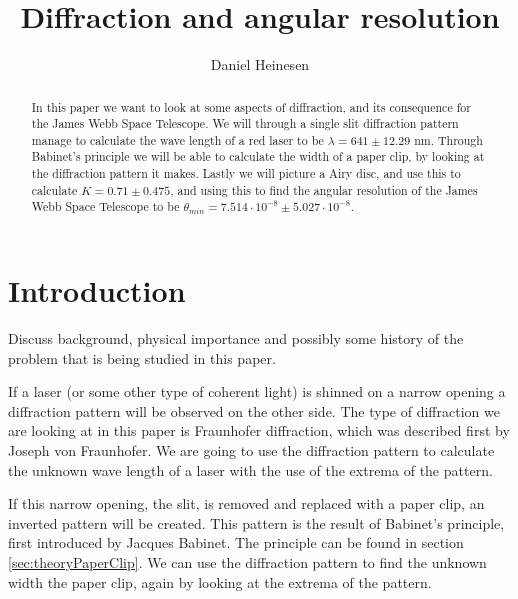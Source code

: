 \documentclass{emulateapj}
\begin{document}
\title{Diffraction and angular resolution}

\author{Daniel Heinesen}





\begin{abstract}
In this paper we want to look at some aspects of diffraction, and its consequence for the James Webb Space Telescope. We will through a single slit diffraction pattern manage to calculate the wave length of a red laser to be $\lambda = 641 \pm 12.29 \text{ nm}$. Through Babinet's principle we will be able to calculate the width of a paper clip, by looking at the diffraction pattern it makes. Lastly we will picture a Airy disc, and use this to calculate $K = 0.71 \pm 0.475$, and using this to find the angular resolution of the James Webb Space Telescope to be $\theta_{min} = 7.514\cdot 10^{-8} \pm 5.027\cdot 10^{-8}$.
\end{abstract}

\section{Introduction}
\label{sec:introduction}

Discuss background, physical importance and possibly some history of
the problem that is being studied in this paper.


If a laser (or some other type of coherent light) is shinned on a narrow opening a diffraction pattern will be observed on the other side. The type of diffraction we are looking at in this paper is Fraunhofer diffraction, which was described first by Joseph von Fraunhofer. We are going to use the diffraction pattern to calculate the unknown wave length of a laser with the use of the extrema of the pattern.

If this narrow opening, the slit, is removed and replaced with a paper clip, an inverted pattern will be created. This pattern is the result of Babinet's principle, first introduced by Jacques Babinet. The principle can be found in section \ref{sec:theoryPaperClip}. We can use the diffraction pattern to find the unknown width the paper clip, again by looking at the extrema of the pattern.
\end{document}
